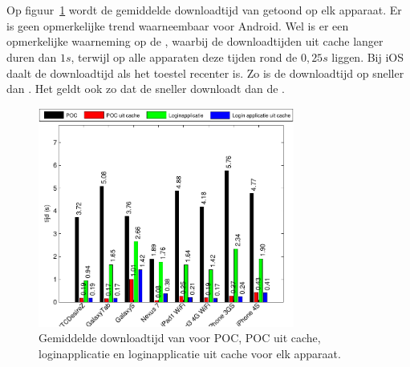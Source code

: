 
\section*{\lungo}
\label{app:performantie-lungo}

Op figuur~\ref{fig:performantie-lungo} wordt de gemiddelde downloadtijd van \lungo{} getoond op elk apparaat.
Er is geen opmerkelijke trend waarneembaar voor Android.
Wel is er een opmerkelijke waarneming op de \gs{}, waarbij de downloadtijden uit cache langer duren dan $1\unit{s}$, terwijl op alle apparaten deze tijden rond de $0,25\unit{s}$ liggen.
Bij iOS daalt de downloadtijd als het toestel recenter is.
Zo is de downloadtijd op \ipadiii{} sneller dan \ipadi{}.
Het geldt ook zo dat de \iphoneiv{} sneller downloadt dan de \iphoneiii{}.

\begin{figure}[H]
  \centering
  \includegraphics[width=0.75\textwidth]{figuren/performance-lungo.pdf}
  \caption{Gemiddelde downloadtijd van \lungo{} voor POC,  POC uit cache,  loginapplicatie en loginapplicatie uit cache voor elk apparaat.}
  \label{fig:performantie-lungo}
\end{figure}

